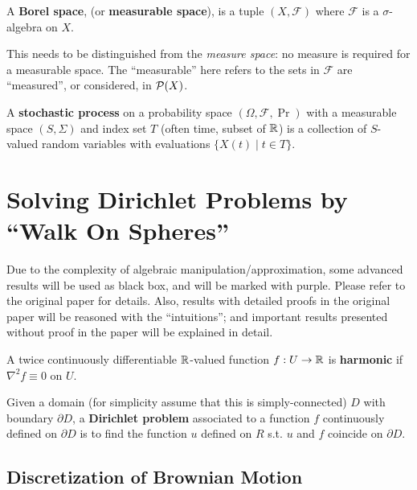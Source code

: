 \documentclass[10pt]{article}
\begin{document}
\begin{definition}
    A \textbf{Borel space}, (or \textbf{measurable space}), is a tuple $(X, \mathcal{F})$ where $\mathcal{F}$ is a $\sigma$-algebra on $X$.
\end{definition}
\nogap
\begin{remark}
    This needs to be distinguished from the \emph{measure space}: no measure is required for a measurable space. The ``measurable'' here refers to the sets in $\mathcal{F}$ are ``measured'', or considered, in $\P(X)$.
\end{remark}

\begin{definition}
    A \textbf{stochastic process} on a probability space $(\Omega, \mathcal{F}, \Pr)$ with a measurable space $(S, \Sigma)$ and index set $T$ (often time, subset of $\R$) is a collection of $S$-valued random variables with evaluations $\{ X(t) \mid t \in T \}$.
\end{definition}

\section{Solving Dirichlet Problems by ``Walk On Spheres'' \cite{WalkOnSphere}}

Due to the complexity of algebraic manipulation/approximation, some advanced results will be used as black box, and will be marked with {\color{darkpurple} purple}. Please refer to the original paper for details. Also, results with detailed proofs in the original paper will be reasoned with the ``intuitions''; and important results presented without proof in the paper will be explained in detail. 

\begin{definition}
    A twice continuously differentiable $\R$-valued function $f: U \to \R$ is \textbf{harmonic} if $\nabla^2 f \equiv 0$ on $U$.
\end{definition}
\nogap
\begin{definition}
    Given a domain (for simplicity assume that this is simply-connected) $D$ with boundary $\partial D$, a \textbf{Dirichlet problem} associated to a function $f$ continuously defined on $\partial D$ is to find the function $u$ defined on $R$ s.t. $u$ and $f$ coincide on $\partial D$.
\end{definition}

\subsection{Discretization of Brownian Motion}
\end{document}
